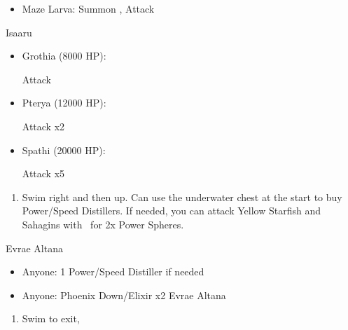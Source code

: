 \begin{encounters}
	\begin{itemize}
		\item Maze Larva: Summon \ixion, Attack
	\end{itemize}
\end{encounters}
\bothvfill
\winvfill
\lossvfill
\begin{battle}{Isaaru}
	\begin{itemize}
		\item Grothia (8000 HP):
		      \begin{itemize}
			      \summon{\bahamut}
			      \bahamutf Attack
		      \end{itemize}
		\item Pterya (12000 HP):
		      \begin{itemize}
			      \summon{\bahamut}
			      \bahamutf Attack x2
		      \end{itemize}
		\item Spathi (20000 HP):
		      \begin{itemize}
			      \summon{\ixion}
			      \ixionf Attack x5
		      \end{itemize}
	\end{itemize}
\end{battle}
\begin{enumerate}[resume]
	\item Swim right and then up. Can use the underwater chest at the start to buy Power/Speed Distillers. If needed, you can attack Yellow Starfish and Sahagins with \tidus\ for 2x Power Spheres.
\end{enumerate}
\begin{battle}{Evrae Altana}
	\begin{itemize}
		\item Anyone: 1 Power/Speed Distiller if needed
		\item Anyone: Phoenix Down/Elixir x2 Evrae Altana
	\end{itemize}
\end{battle}
\begin{enumerate}[resume]
	\item Swim to exit, \sd
\end{enumerate}
\ 
\bothvfill
\ \bothnewline
\bothcb
\ 